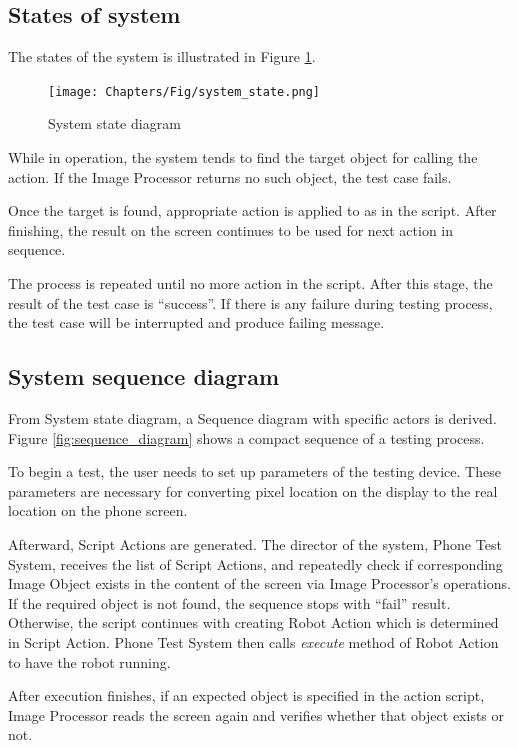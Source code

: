 \subsection{States of system}
The states of the system is illustrated in Figure \ref{fig:system_state}.

    \begin{figure}[H]
		\centering
		\texttt{[image: Chapters/Fig/system\_state.png]}
		\caption{System state diagram}
		\label{fig:system_state}
	\end{figure}

While in operation, the system tends to find the target object for calling the action. If the Image Processor returns no such object, the test case fails.

Once the target is found, appropriate action is applied to as in the script. After finishing, the result on the screen continues to be used for next action in sequence.

The process is repeated until no more action in the script. After this stage, the result of the test case is ``success''. If there is any failure during testing process, the test case will be interrupted and produce failing message.

\subsection{System sequence diagram}
From System state diagram, a Sequence diagram with specific actors is derived. Figure \ref{fig:sequence_diagram} shows a compact sequence of a testing process.

To begin a test, the user needs to set up parameters of the testing device. These parameters are necessary for converting pixel location on the display to the real location on the phone screen.

Afterward, Script Actions are generated. The director of the system, Phone Test System, receives the list of Script Actions, and repeatedly check if corresponding Image Object exists in the content of the screen via Image Processor's operations. If the required object is not found, the sequence stops with ``fail'' result. Otherwise, the script continues with creating Robot Action which is determined in Script Action. Phone Test System then calls \textit{execute} method of Robot Action to have the robot running.

After execution finishes, if an expected object is specified in the action script, Image Processor reads the screen again and verifies whether that object exists or not.

